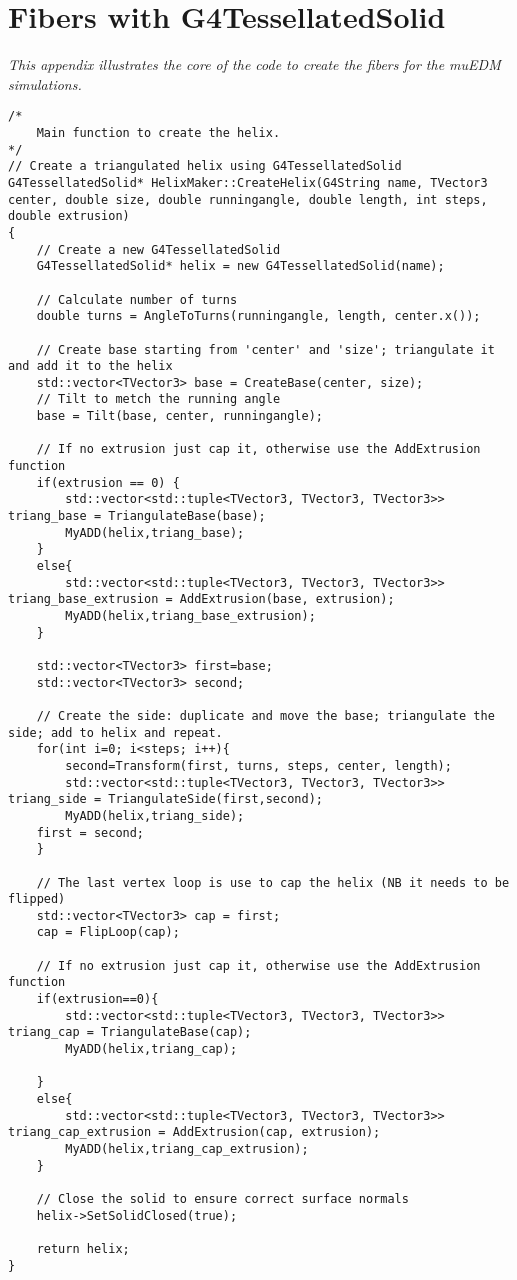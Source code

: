 
\chapter{Fibers with G4TessellatedSolid}
{\itshape
This appendix illustrates the core of the code to create the fibers for the \gf muEDM simulations.}
\label{ch:G4TessellatedSolid}
\begin{lstlisting}
/*
    Main function to create the helix. 
*/
// Create a triangulated helix using G4TessellatedSolid
G4TessellatedSolid* HelixMaker::CreateHelix(G4String name, TVector3 center, double size, double runningangle, double length, int steps, double extrusion)
{
    // Create a new G4TessellatedSolid
    G4TessellatedSolid* helix = new G4TessellatedSolid(name);

    // Calculate number of turns
    double turns = AngleToTurns(runningangle, length, center.x());
	
    // Create base starting from 'center' and 'size'; triangulate it and add it to the helix
    std::vector<TVector3> base = CreateBase(center, size);
    // Tilt to metch the running angle
    base = Tilt(base, center, runningangle);

    // If no extrusion just cap it, otherwise use the AddExtrusion function
    if(extrusion == 0) {
        std::vector<std::tuple<TVector3, TVector3, TVector3>> triang_base = TriangulateBase(base);
        MyADD(helix,triang_base);
    }
    else{
        std::vector<std::tuple<TVector3, TVector3, TVector3>> triang_base_extrusion = AddExtrusion(base, extrusion);
        MyADD(helix,triang_base_extrusion);
    }

    std::vector<TVector3> first=base;
    std::vector<TVector3> second;

    // Create the side: duplicate and move the base; triangulate the side; add to helix and repeat. 
    for(int i=0; i<steps; i++){
        second=Transform(first, turns, steps, center, length);
        std::vector<std::tuple<TVector3, TVector3, TVector3>> triang_side = TriangulateSide(first,second);
        MyADD(helix,triang_side);
	first = second; 
    }

    // The last vertex loop is use to cap the helix (NB it needs to be flipped)
    std::vector<TVector3> cap = first;
    cap = FlipLoop(cap);

    // If no extrusion just cap it, otherwise use the AddExtrusion function
    if(extrusion==0){
        std::vector<std::tuple<TVector3, TVector3, TVector3>> triang_cap = TriangulateBase(cap);
        MyADD(helix,triang_cap);
	
    }
    else{
        std::vector<std::tuple<TVector3, TVector3, TVector3>> triang_cap_extrusion = AddExtrusion(cap, extrusion);
        MyADD(helix,triang_cap_extrusion);
    }
	
    // Close the solid to ensure correct surface normals
    helix->SetSolidClosed(true);

    return helix;
}

\end{lstlisting}
